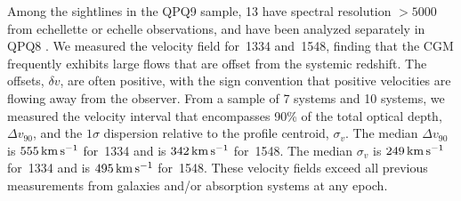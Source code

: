 \documentclass[iop]{emulateapj}
\begin{document}
Among the sightlines in the QPQ9 sample, 13 have spectral resolution $> 5000$ from echellette or 
echelle observations, and have been analyzed separately in QPQ8 \citep{QPQ8}. We measured the 
velocity field for \,1334 and \,1548, finding that the CGM frequently exhibits 
large flows that are offset from the systemic redshift. The offsets, $\delta v$, are often 
positive, with the sign convention that positive velocities are flowing away from the observer. 
From a sample of 7  systems and 10  systems, we measured the velocity 
interval that encompasses 90\% of the total optical depth, $\Delta v_{90}$, and the $1\sigma$ 
dispersion relative to the profile centroid, $\sigma_v$. The median $\Delta v_{90}$ is 
$555\,{\rm km\,s^{-1}}$ for \,1334 and is $342\,{\rm km\,s^{-1}}$ for \,1548. 
The median $\sigma_v$ is $249\,{\rm km\,s^{-1}}$ for \,1334 and is 
$495\,{\rm km\,s^{-1}}$ for \,1548. These velocity fields exceed all previous 
measurements from galaxies and/or absorption systems at any epoch. 
\end{document}
